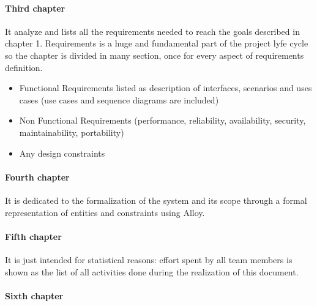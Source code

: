\documentclass[../rasd.tex]{subfiles}
\begin{document}
		\paragraph{Third chapter}
		It analyze and lists all the requirements needed to reach the goals described in chapter 1. Requirements is a huge and fundamental part of the project lyfe cycle so the chapter is divided in many section, once for every aspect of requirements definition.
		\begin{itemize}
			\item Functional Requirements listed as description of interfaces, scenarios and uses cases (use cases and sequence diagrams are included)
			\item Non Functional Requirements (performance, reliability, availability, security, maintainability, portability)
			\item Any design constraints
		\end{itemize}
		\paragraph{Fourth chapter}
		It is dedicated to the formalization of the system and its scope through a formal representation of entities and constraints using Alloy.
		\paragraph{Fifth chapter}
		It is just intended for statistical reasons: effort spent by all team members is shown as the list of all activities done during the realization of this document.
		\paragraph{Sixth chapter}
		
\end{document}
